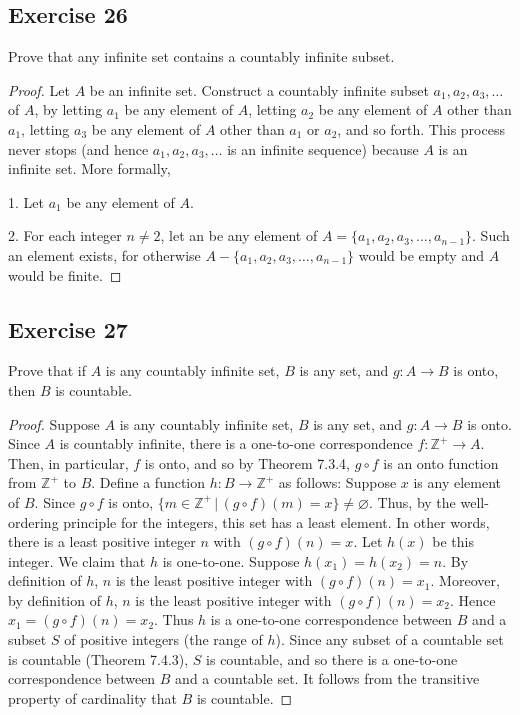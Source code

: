 \documentclass[14pt]{extarticle}
\newcommand{\es}{\varnothing}
\newcommand{\Z}{\mathbb{Z}}
\begin{document}
\subsection{Exercise 26}
Prove that any infinite set contains a countably infinite subset.

\begin{proof}
    Let $A$ be an infinite set. Construct a countably infinite subset \(a_1, a_2, a_3, \ldots\) of $A$, by letting $a_1$
    be any element of $A$, letting $a_2$ be any element of $A$ other than $a_1$, letting $a_3$ be any element of $A$ other
    than $a_1$ or $a_2$, and so forth. This process never stops (and hence \(a_1, a_2, a_3, \ldots\) is an infinite
    sequence) because $A$ is an infinite set. More formally,

    1. Let $a_1$ be any element of $A$.

    2. For each integer \(n \neq 2\), let an be any element of \(A = \{a_1, a_2, a_3, \ldots, a_{n-1}\}\). Such an element
    exists, for otherwise \(A - \{a_1, a_2, a_3, \ldots, a_{n-1}\}\) would be empty and $A$ would be finite.
\end{proof}

\subsection{Exercise 27}
Prove that if $A$ is any countably infinite set, $B$ is any set, and \(g: A \to B\) is onto, then $B$ is countable.

\begin{proof}
    Suppose $A$ is any countably infinite set, $B$ is any set, and \(g: A \to B\) is onto. Since $A$ is countably
    infinite, there is a one-to-one correspondence \(f: \Z^+ \to A\). Then, in particular, $f$ is onto, and so by
    Theorem 7.3.4, \(g \circ f\) is an onto function from \(\Z^+\) to $B$. Define a function \(h: B \to \Z^+\) as
    follows: Suppose $x$ is any element of $B$. Since \(g \circ f\) is onto, \(\{m \in \Z^+ \, | \, (g \circ f)(m) = x\}
    \neq \es\). Thus, by the well-ordering principle for the integers, this set has a least element. In other words,
    there is a least positive integer $n$ with \((g \circ f)(n) = x\). Let $h(x)$ be this integer. We claim that $h$ is
    one-to-one. Suppose \(h(x_1) = h(x_2) = n\). By definition of $h$, $n$ is the least positive integer with \((g \circ
    f)(n) = x_1\). Moreover, by definition of $h$, $n$ is the least positive integer with \((g \circ f)(n) = x_2\). Hence
    \(x_1 = (g \circ f)(n) = x_2\). Thus $h$ is a one-to-one correspondence between $B$ and a subset $S$ of positive
    integers (the range of $h$). Since any subset of a countable set is countable (Theorem 7.4.3), $S$ is
    countable, and so there is a one-to-one correspondence between $B$ and a countable set. It follows from the
    transitive property of cardinality that $B$ is countable.
\end{proof}
\end{document}
